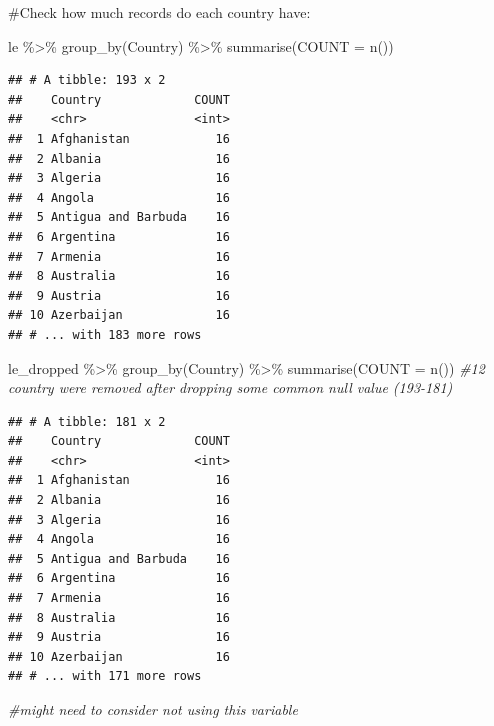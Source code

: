 \documentclass[
]{article}
\newenvironment{Shaded}{\begin{snugshade}}{\end{snugshade}}
\newcommand{\AttributeTok}[1]{\textcolor[rgb]{0.77,0.63,0.00}{#1}}
\newcommand{\CommentTok}[1]{\textcolor[rgb]{0.56,0.35,0.01}{\textit{#1}}}
\newcommand{\FunctionTok}[1]{\textcolor[rgb]{0.00,0.00,0.00}{#1}}
\newcommand{\NormalTok}[1]{#1}
\newcommand{\SpecialCharTok}[1]{\textcolor[rgb]{0.00,0.00,0.00}{#1}}
\begin{document}
\#Check how much records do each country have:

\begin{Shaded}
\begin{Highlighting}[]
\NormalTok{le }\SpecialCharTok{\%\textgreater{}\%} \FunctionTok{group\_by}\NormalTok{(Country) }\SpecialCharTok{\%\textgreater{}\%} \FunctionTok{summarise}\NormalTok{(}\AttributeTok{COUNT =} \FunctionTok{n}\NormalTok{())}
\end{Highlighting}
\end{Shaded}

\begin{verbatim}
## # A tibble: 193 x 2
##    Country             COUNT
##    <chr>               <int>
##  1 Afghanistan            16
##  2 Albania                16
##  3 Algeria                16
##  4 Angola                 16
##  5 Antigua and Barbuda    16
##  6 Argentina              16
##  7 Armenia                16
##  8 Australia              16
##  9 Austria                16
## 10 Azerbaijan             16
## # ... with 183 more rows
\end{verbatim}

\begin{Shaded}
\begin{Highlighting}[]
\NormalTok{le\_dropped }\SpecialCharTok{\%\textgreater{}\%} \FunctionTok{group\_by}\NormalTok{(Country) }\SpecialCharTok{\%\textgreater{}\%} \FunctionTok{summarise}\NormalTok{(}\AttributeTok{COUNT =} \FunctionTok{n}\NormalTok{()) }\CommentTok{\#12 country were removed after dropping some common null value (193{-}181)}
\end{Highlighting}
\end{Shaded}

\begin{verbatim}
## # A tibble: 181 x 2
##    Country             COUNT
##    <chr>               <int>
##  1 Afghanistan            16
##  2 Albania                16
##  3 Algeria                16
##  4 Angola                 16
##  5 Antigua and Barbuda    16
##  6 Argentina              16
##  7 Armenia                16
##  8 Australia              16
##  9 Austria                16
## 10 Azerbaijan             16
## # ... with 171 more rows
\end{verbatim}

\begin{Shaded}
\begin{Highlighting}[]
\CommentTok{\#might need to consider not using this variable }
\end{Highlighting}
\end{Shaded}
\end{document}
